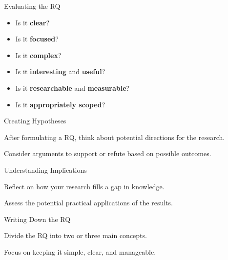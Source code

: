 \begin{frame}{Evaluating the RQ}
\begin{block}{}
\begin{itemize}
\onslide<+-> \item Is it \textbf{clear}?
\onslide<+-> \item Is it \textbf{focused}?
\onslide<+-> \item Is it \textbf{complex}?
\onslide<+-> \item Is it \textbf{interesting} and \textbf{useful}?
\onslide<+-> \item Is it \textbf{researchable} and \textbf{measurable}?
\onslide<+-> \item Is it \textbf{appropriately scoped}?
\end{itemize}
\end{block}
\end{frame}

\begin{frame}{Creating Hypotheses}
\begin{block}{}
\onslide<+-> After formulating a RQ, think about potential directions for the research.

\vspace{0.3cm}

\onslide<+-> Consider arguments to support or refute based on possible outcomes.
\end{block}
\end{frame}

\begin{frame}{Understanding Implications}
\begin{block}{}
\onslide<+-> Reflect on how your research fills a gap in knowledge.

\vspace{0.3cm}

\onslide<+-> Assess the potential practical applications of the results.
\end{block}
\end{frame}

\begin{frame}{Writing Down the RQ}
\begin{block}{}
\onslide<+-> Divide the RQ into two or three main concepts.

\vspace{0.3cm}

\onslide<+-> Focus on keeping it simple, clear, and manageable.
\end{block}
\end{frame}
